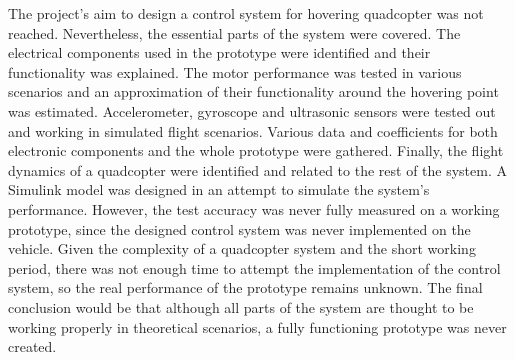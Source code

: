 The project's aim to design a control system for hovering quadcopter was not reached. Nevertheless, the essential parts of the system were covered. The electrical components used in the prototype were identified and their functionality was explained. The motor performance was tested in various scenarios and an approximation of their functionality around the hovering point was estimated.
Accelerometer, gyroscope and ultrasonic sensors were tested out and working in simulated flight scenarios.
Various data and coefficients for both electronic components and the whole prototype were gathered.
Finally, the flight dynamics of a quadcopter were identified and related to the rest of the system. A Simulink model was designed in an attempt to simulate the system's performance.
However, the test accuracy was never fully measured on a working prototype, since the designed control system was never implemented on the vehicle. Given the complexity of a quadcopter system and the short working period, there was not enough time to attempt the implementation of the control system, so the real performance of the prototype remains unknown.
The final conclusion would be that although all parts of the system are thought to be working properly in theoretical scenarios, a fully functioning prototype was never created.